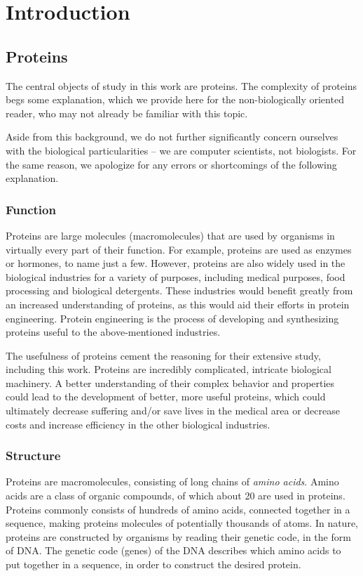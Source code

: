 \chapter{Introduction}


\section{Proteins}
The central objects of study in this work are proteins. The complexity of proteins begs some explanation, which we provide here for the non-biologically oriented reader, who may not already be familiar with this topic.

Aside from this background, we do not further significantly concern ourselves with the biological particularities -- we are computer scientists, not biologists. For the same reason, we apologize for any errors or shortcomings of the following explanation.

\subsection{Function}
Proteins are large molecules (macromolecules) that are used by organisms in virtually every part of their function. For example, proteins are used as enzymes or hormones, to name just a few. However, proteins are also widely used in the biological industries for a variety of purposes, including medical purposes, food processing and biological detergents. These industries would benefit greatly from an increased understanding of proteins, as this would aid their efforts in protein engineering. Protein engineering is the process of developing and synthesizing proteins useful to the above-mentioned industries.

The usefulness of proteins cement the reasoning for their extensive study, including this work. Proteins are incredibly complicated, intricate biological machinery. A better understanding of their complex behavior and properties could lead to the development of better, more useful proteins, which could ultimately decrease suffering and/or save lives in the medical area or decrease costs and increase efficiency in the other biological industries.

\subsection{Structure}
Proteins are macromolecules, consisting of long chains of \textit{amino acids}. Amino acids are a class of organic compounds, of which about 20 are used in proteins. Proteins commonly consists of hundreds of amino acids, connected together in a sequence, making proteins molecules of potentially thousands of atoms. In nature, proteins are constructed by organisms by reading their genetic code, in the form of DNA. The genetic code (genes) of the DNA describes which amino acids to put together in a sequence, in order to construct the desired protein.

